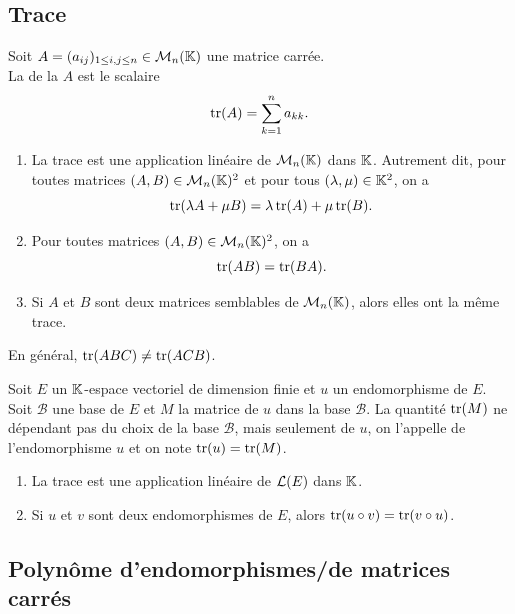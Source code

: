 \documentclass{book}
\begin{document}
\subsection{Trace}
\begin{Definition}[Trace]
Soit $A = (a_{ij})_{1\leq i,j\leq n}\in  \mathcal{M}_{n}(\mathbb{K})$ une matrice carrée.\\
La  de la $A$ est le scalaire
\[ \operatorname{tr}(A) = \sum  _{k=1}^n a_{k k}. \]
\end{Definition}
\begin{Proposition}[Propriétés]
\begin{enumerate}
\item La trace est une application linéaire de $\mathcal{M}_{n}(\mathbb{K})$ dans $\mathbb{K} $.
  Autrement dit, pour toutes matrices $(A,B)\in  \mathcal{M}_{n}(\mathbb{K})^2$ et pour tous $(\lambda ,\mu  )\in  \mathbb{K} ^2$, on a
  \[ \operatorname{tr}(\lambda A + \mu  B) = \lambda \operatorname{tr}(A) + \mu  \operatorname{tr}(B). \]
\item Pour toutes matrices $(A,B) \in  \mathcal{M}_{n}(\mathbb{K})^2$, on a
  \[ \operatorname{tr}(AB) = \operatorname{tr}(BA). \]
\item Si $A$ et $B$ sont deux matrices semblables de $\mathcal{M}_{n}(\mathbb{K})$, alors elles ont la même trace.
\end{enumerate}
\end{Proposition}
\begin{Remarque}
En général, $\operatorname{tr}(ABC)\neq \operatorname{tr}(ACB)$.
\end{Remarque}

\begin{Definition}
Soit $E$ un $\mathbb{K} $-espace vectoriel de dimension finie et $u$ un endomorphisme de $E$.
Soit $\mathcal{B}$ une base de $E$ et $M$ la matrice de $u$ dans la base $\mathcal{B}$.
La quantité $\operatorname{tr}(M)$ ne dépendant pas du choix de la base $\mathcal{B}$, mais seulement de $u$, on l'appelle  de l'endomorphisme $u$ et on note $\operatorname{tr}(u) = \operatorname{tr}(M)$.
\end{Definition}


\begin{Proposition}[Propriétés]
\begin{enumerate}
\item La trace est une application linéaire de $\mathcal{L}(E)$ dans $\mathbb{K} $.
\item Si $u$ et $v$ sont deux endomorphismes de $E$, alors $\operatorname{tr}(u\circ v) = \operatorname{tr}(v\circ u)$.
\end{enumerate}
\end{Proposition}

\subsection{Polynôme d'endomorphismes/de matrices carrés}
\end{document}
